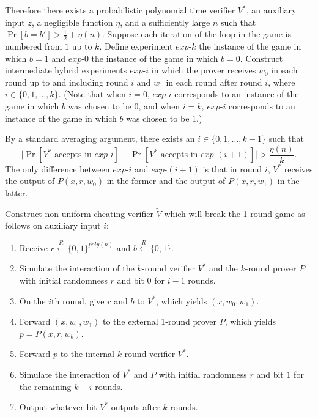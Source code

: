 \documentclass[draft]{article}
\newcommand{\getr}{\overset{R}{\gets}}
\begin{document}
\begin{enumerate}
  Therefore there exists a probabilistic polynomial time verifier $V^*$, an auxiliary input $z$, a negligible function $\eta$, and a sufficiently large $n$ such that $\Pr[b=b'] > \frac{1}{2} + \eta(n)$.
  Suppose each iteration of the loop in the game is numbered from $1$ up to $k$.
  Define experiment $exp\mbox{-}k$ the instance of the game in which $b=1$ and $exp\mbox{-}0$ the instance of the game in which $b=0$.
  Construct intermediate hybrid experiments $exp\mbox{-}i$ in which the prover receives $w_0$ in each round up to and including round $i$ and $w_1$ in each round after round $i$, where $i\in\{0, 1, \ldots, k\}$.
  (Note that when $i=0$, $exp\mbox{-}i$ corresponds to an instance of the game in which $b$ was chosen to be $0$, and when $i=k$, $exp\mbox{-}i$ corresponds to an instance of the game in which $b$ was chosen to be $1$.)

  By a standard averaging argument, there exists an $i\in\{0,1,\ldots, k-1\}$ such that
  \begin{displaymath}
    \big|\Pr\left[V^*\text{ accepts in } exp\mbox{-}i\right] - \Pr\left[V^*\text{ accepts in } exp\mbox{-}(i+1)\right]\big| > \frac{\eta(n)}{k}.
  \end{displaymath}
  The only difference between $exp\mbox{-}i$ and $exp\mbox{-}(i+1)$ is that in round $i$, $V^*$ receives the output of $P(x, r, w_0)$ in the former and the output of $P(x, r, w_1)$ in the latter.

  Construct non-uniform cheating verifier $\tilde{V}$ which will break the 1-round game as follows on auxiliary input $i$:
  \begin{enumerate}
  \item Receive $r\getr\{0,1\}^{poly(n)}$ and $b\getr\{0, 1\}$.
  \item Simulate the interaction of the $k$-round verifier $V^*$ and the $k$-round prover $P$ with initial randomness $r$ and bit $0$ for $i - 1$ rounds.
  \item On the $i$th round, give $r$ and $b$ to $V^*$, which yields $(x, w_0, w_1)$.
  \item Forward $(x, w_0, w_1)$ to the external 1-round prover $P$, which yields $p=P(x, r, w_b)$.
  \item Forward $p$ to the internal $k$-round verifier $V^*$.
  \item Simulate the interaction of $V^*$ and $P$ with initial randomness $r$ and bit $1$ for the remaining $k - i$ rounds.
  \item Output whatever bit $V^*$ outputs after $k$ rounds.
  \end{enumerate}


\end{enumerate}
\end{document}
